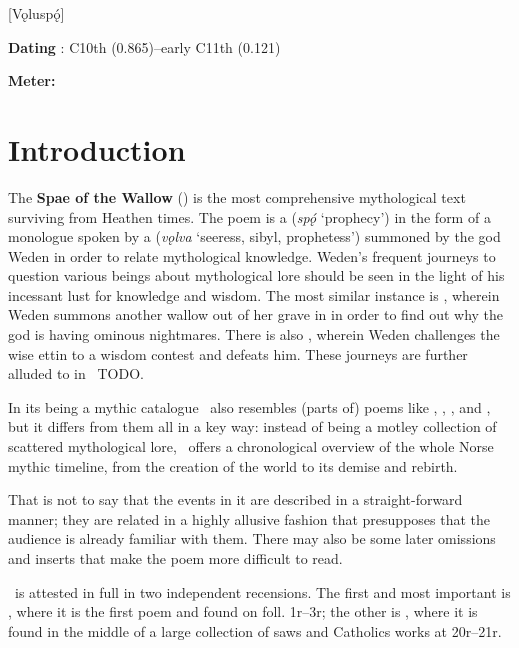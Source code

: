[Vǫluspǫ́]

\begin{flushright}%
\textbf{Dating} \parencite{Sapp2022}: C10th (0.865)–early C11th (0.121)

\textbf{Meter:} \Fornyrdislag%
\end{flushright}

\section{Introduction}

The \textbf{Spae of the Wallow} (\Voluspa) is the most comprehensive mythological text surviving from Heathen times.  The poem is a  (\emph{spǫ́} ‘prophecy’) in the form of a monologue spoken by a  (\emph{vǫlva} ‘seeress, sibyl, prophetess’) summoned by the god Weden in order to relate mythological knowledge.  Weden’s frequent journeys to question various beings about mythological lore should be seen in the light of his incessant lust for knowledge and wisdom.  The most similar instance is \Baldrsdraumar, wherein Weden summons another wallow out of her grave in  in order to find out why the god  is having ominous nightmares.  There is also \Vafthrudnismal, wherein Weden challenges the wise ettin  to a wisdom contest and defeats him.  These journeys are further alluded to in \Harbardsljod\ TODO.

In its being a mythic catalogue \Voluspa\ also resembles (parts of) poems like \Havamal, \Grimnismal, \Sigrdrifumal, and \Allvismal, but it differs from them all in a key way: instead of being a motley collection of scattered mythological lore, \Voluspa\ offers a chronological overview of the whole Norse mythic timeline, from the creation of the world to its demise and rebirth.

That is not to say that the events in it are described in a straight-forward manner; they are related in a highly allusive fashion that presupposes that the audience is already familiar with them.  There may also be some later omissions and inserts that make the poem more difficult to read.

\Voluspa\ is attested in full in two independent recensions.  The first and most important is \Regius, where it is the first poem and found on foll. 1r–3r; the other is \Hauksbok, where it is found in the middle of a large collection of saws and Catholics works at 20r–21r.

